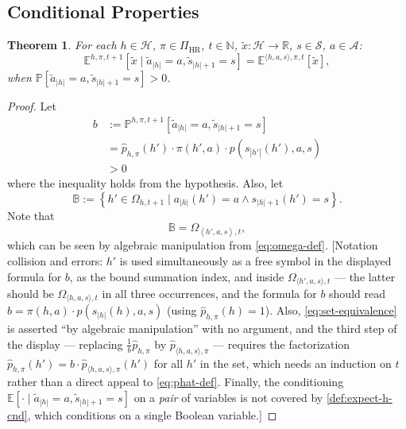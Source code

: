 \documentclass[letterpaper]{article}
\theoremstyle{plain}
\newtheorem{theorem}{Theorem}[subsection]
\theoremstyle{definition}
\theoremstyle{remark}
\newcommand{\Nats}{\mathbb{N}}
\newcommand{\Real}{\mathbb{R}}
\newcommand{\E}{\mathbb{E}}
\newcommand{\PiHR}{\Pi_{\mathrm{HR}}}
\newcommand{\cc}[1]{\textcolor{ccolor}{[#1]}}
\newcommand{\lean}[1]{\textcolor{blue}{(\emph{LEAN}: \texttt{#1})}}
\begin{document}
\subsection{Conditional Properties}

\begin{theorem} \label{thm:exph-cond-eq-hist}
For each $h\in \mathcal{H}$, $\pi\in \PiHR$, $t\in \Nats$, $\tilde{x}\colon \mathcal{H} \to \Real$, $s\in \mathcal{S}$, $a\in \mathcal{A}$:
\[
  \E^{h,\pi,t+1}[\tilde{x} \mid \tilde{a}_{|h|} = a, \tilde{s}_{|h|+1} = s]
  =
  \E^{\langle h, a, s\rangle,\pi,t}[\tilde{x}],
\]
when $\mathbb{P} [\tilde{a}_{|h|} = a, \tilde{s}_{|h|+1} = s] > 0$.
\end{theorem}
\begin{proof}
  Let
  \[
    \begin{aligned}
      b &:= \mathbb{P}^{h,\pi,t+1} \left[ \tilde{a}_{|h|} = a, \tilde{s}_{|h|+1} = s \right] \\
      &= \hat{p}_{h,\pi}(h') \cdot  \pi(h', a) \cdot p(s_{|h'|}(h'), a, s) \\
       &> 0
    \end{aligned}
  \]
  where the inequality holds from the hypothesis. Also, let
  \[
    \mathbb{B} := \left\{ h'\in \Omega_{h,t+1} \mid a_{|h|}(h') = a \wedge s_{|h|+1}(h') = s\right\}.
  \]
  Note that
  \begin{equation} \label{eq:set-equivalence}
    \mathbb{B} = \Omega_{\left< h', a, s \right>, t},
\end{equation}
  which can be seen by algebraic manipulation from \eqref{eq:omega-def}.
  \cc{Notation collision and errors: $h'$ is used simultaneously as a free symbol in the displayed formula for $b$, as the bound summation index, and inside $\Omega_{\langle h',a,s\rangle,t}$ --- the latter should be $\Omega_{\langle h,a,s\rangle,t}$ in all three occurrences, and the formula for $b$ should read $b = \pi(h,a)\cdot p(s_{|h|}(h),a,s)$ (using $\hat{p}_{h,\pi}(h)=1$). Also, \eqref{eq:set-equivalence} is asserted ``by algebraic manipulation'' with no argument, and the third step of the display --- replacing $\frac{1}{b}\hat{p}_{h,\pi}$ by $\hat{p}_{\langle h,a,s\rangle,\pi}$ --- requires the factorization $\hat{p}_{h,\pi}(h') = b\cdot \hat{p}_{\langle h,a,s\rangle,\pi}(h')$ for all $h'$ in the set, which needs an induction on $t$ rather than a direct appeal to \eqref{eq:phat-def}. Finally, the conditioning $\E[\cdot\mid \tilde{a}_{|h|}=a,\tilde{s}_{|h|+1}=s]$ on a \emph{pair} of variables is not covered by \cref{def:expect-h-cnd}, which conditions on a single Boolean variable.}


\end{proof}
\end{document}
